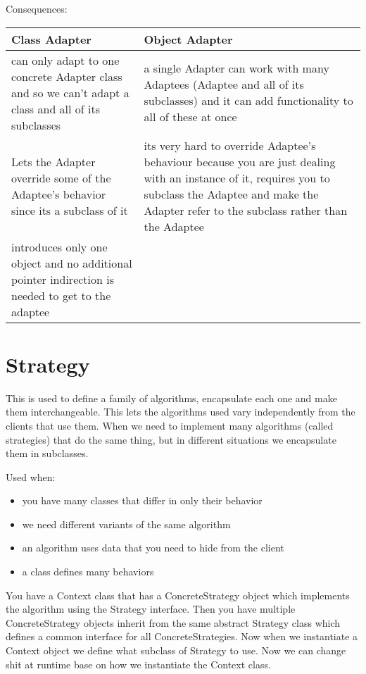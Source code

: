 \documentclass[12pt]{article}
\begin{document}
Consequences:

\begin{tabular}{| p{9cm} | p{9cm} |}
\hline
\textbf{Class Adapter} & \textbf{Object Adapter}\\
\hline
can only adapt to one concrete Adapter class and so we can't adapt a class and all of its subclasses & a single Adapter can work with many Adaptees (Adaptee and all of its subclasses) and it can add functionality to all of these at once\\
\hline
Lets the Adapter override some of the Adaptee's behavior since its a subclass of it & its very hard to override Adaptee's behaviour because you are just dealing with an instance of it, requires you to subclass the Adaptee and make the Adapter refer to the subclass rather than the Adaptee\\
\hline
introduces only one object and no additional pointer indirection is needed to get to the adaptee&\\
\hline
\end{tabular}

\section*{Strategy}
This is used to define a family of algorithms, encapsulate each one and make them interchangeable. This lets the algorithms used vary independently from the clients that use them. When we need to implement many algorithms (called strategies) that do the same thing, but in different situations we encapsulate them in subclasses.

Used when:
\begin{itemize}
    \item you have many classes that differ in only their behavior
    \item we need different variants of the same algorithm
    \item an algorithm uses data that you need to hide from the client
    \item a class defines many behaviors
\end{itemize}

You have a Context class that has a ConcreteStrategy object which implements the algorithm using the Strategy interface. Then you have multiple ConcreteStrategy objects inherit from the same abstract Strategy class which defines a common interface for all ConcreteStrategies. Now when we instantiate a Context object we define what subclass of Strategy to use. Now we can change shit at runtime base on how we instantiate the Context class.
\end{document}
